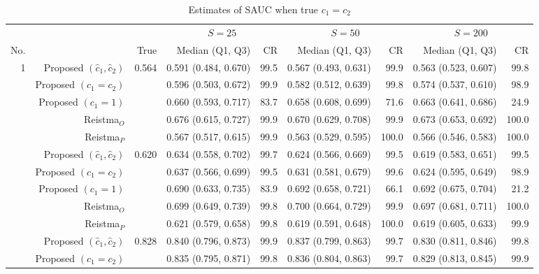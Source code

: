 \begin{table}

\caption{Estimates of SAUC when true $c_1 = c_2$}
\centering
\begin{threeparttable}
\begin{tabular}[t]{rrrrrrrrr}
\toprule
\multicolumn{1}{c}{} & \multicolumn{1}{c}{} & \multicolumn{1}{c}{} & \multicolumn{2}{c}{$S = 25$} & \multicolumn{2}{c}{$S = 50$} & \multicolumn{2}{c}{$S = 200$} \\
\cmidrule(l{3pt}r{3pt}){4-5} \cmidrule(l{3pt}r{3pt}){6-7} \cmidrule(l{3pt}r{3pt}){8-9}
No. &   & True & Median (Q1, Q3) & CR & Median (Q1, Q3) & CR & Median (Q1, Q3) & CR\\
\midrule
1 & Proposed $(\hat{c}_1, \hat{c}_2)$ & 0.564 & 0.591 (0.484, 0.670) & 99.5 & 0.567 (0.493, 0.631) & 99.9 & 0.563 (0.523, 0.607) & 99.8\\
 & Proposed $(c_1 = c_2)$ &  & 0.596 (0.503, 0.672) & 99.9 & 0.582 (0.512, 0.639) & 99.8 & 0.574 (0.537, 0.610) & 98.9\\
 & Proposed $(c_1 = 1)$ &  & 0.660 (0.593, 0.717) & 83.7 & 0.658 (0.608, 0.699) & 71.6 & 0.663 (0.641, 0.686) & 24.9\\
 & Reistma$_O$ &  & 0.676 (0.615, 0.727) & 99.9 & 0.670 (0.629, 0.708) & 99.9 & 0.673 (0.653, 0.692) & 100.0\\
 & Reistma$_P$ &  & 0.567 (0.517, 0.615) & 99.9 & 0.563 (0.529, 0.595) & 100.0 & 0.566 (0.546, 0.583) & 100.0\\
\addlinespace
2 & Proposed $(\hat{c}_1, \hat{c}_2)$ & 0.620 & 0.634 (0.558, 0.702) & 99.7 & 0.624 (0.566, 0.669) & 99.5 & 0.619 (0.583, 0.651) & 99.5\\
 & Proposed $(c_1 = c_2)$ &  & 0.637 (0.566, 0.699) & 99.5 & 0.631 (0.581, 0.679) & 99.6 & 0.624 (0.595, 0.649) & 98.9\\
 & Proposed $(c_1 = 1)$ &  & 0.690 (0.633, 0.735) & 83.9 & 0.692 (0.658, 0.721) & 66.1 & 0.692 (0.675, 0.704) & 21.2\\
 & Reistma$_O$ &  & 0.699 (0.649, 0.739) & 99.8 & 0.700 (0.664, 0.729) & 99.9 & 0.697 (0.681, 0.711) & 100.0\\
 & Reistma$_P$ &  & 0.621 (0.579, 0.658) & 99.8 & 0.619 (0.591, 0.648) & 100.0 & 0.619 (0.605, 0.633) & 99.9\\
\addlinespace
3 & Proposed $(\hat{c}_1, \hat{c}_2)$ & 0.828 & 0.840 (0.796, 0.873) & 99.9 & 0.837 (0.799, 0.863) & 99.7 & 0.830 (0.811, 0.846) & 99.8\\
 & Proposed $(c_1 = c_2)$ &  & 0.835 (0.795, 0.871) & 99.8 & 0.836 (0.804, 0.863) & 99.7 & 0.829 (0.813, 0.845) & 99.9\\

\end{tabular}
\end{threeparttable}
\end{table}
